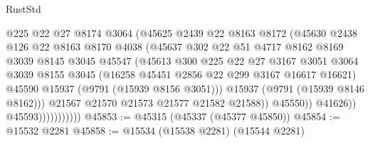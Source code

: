 \begin{lexlean}{RustStd}
\begin{coremodule}
                                  @225
                                  @22
                                  @27
                                  @8174
                                  @3064
                                  (@45625
                                    @2439
                                    @22
                                    @8163
                                    @8172
                                    (@45630
                                      @2438
                                      @126
                                      @22
                                      @8163
                                      @8170
                                      @4038
                                      (@45637
                                        @302
                                        @22
                                        @51
                                        @4717
                                        @8162
                                        @8169
                                        @3039
                                        @8145
                                        @3045
                                        @45547
                                        (@45613
                                          @300
                                          @225
                                          @22
                                          @27
                                          @3167
                                          @3051
                                          @3064
                                          @3039
                                          @8155
                                          @3045
                                          (@16258 @45451 @2856 @22 @299 @3167 @16617 @16621)
                                          @45590
                                          @15937
                                          (@9791 (@15939 @8156 @3051)))
                                        @15937
                                        (@9791 (@15939 @8146 @8162)))
                                      @21567
                                      @21570
                                      @21573
                                      @21577
                                      @21582
                                      @21588))
                                  @45550))
                              @41626))
                          @45593)))))))))))
@45853 := @45315 (@45337 (@45377 @45850))
@45854 := @15532 @2281
@45858 := @15534 (@15538 @2281) (@15544 @2281)

\end{coremodule}
\end{lexlean}
